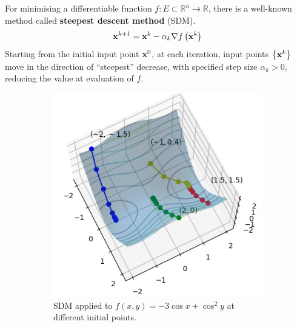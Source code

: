 \documentclass[../dissertation.tex]{subfiles}
\begin{document}
For minimising a differentiable function $f:E \subset \mathbb{R}^n \rightarrow \mathbb{R}$, there is a well-known method called \textbf{steepest descent method} (SDM)\cite{doi:10.1137/1.9781611974997.ch8}.
\begin{equation}
    \mathbf{x}^{k+1} = \mathbf{x}^{k} - \alpha_k \nabla f \left( \mathbf{x}^{k} \right)
    \label{equ: SDM}
\end{equation}
Starting from the initial input point $\mathbf{x}^{0}$, at each iteration, input points $\left\{ \mathbf{x}^{k} \right\}$ move in the direction of ``steepest'' decrease,
with specified step size $\alpha_k > 0$,
reducing the value at evaluation of $f$.
\begin{figure}[tbp]
    \centering
    \begin{subfigure}[b]{0.4\textwidth}
        \centering
        \includegraphics[width=\textwidth]{sections/gradientFlowImgs/sdm}
        \caption{SDM applied to $f(x,y) = -3 \cos x + \cos^2 y$ at different initial points.}
        \label{fig: SDM}
    \end{subfigure}
    \hspace{1cm}
    \begin{subfigure}[b]{0.4\textwidth}
        \centering

\end{subfigure}
\end{figure}
\end{document}

